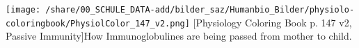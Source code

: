 		\begin{minipage}{8cm}
		  \texttt{[image: /share/00\_SCHULE\_DATA-add/bilder\_saz/Humanbio\_Bilder/physiolo-coloringbook/PhysiolColor\_147\_v2.png]}
		  [Physiology Coloring Book p. 147 v2, Passive Immunity]{How Immunoglobulines are being passed from mother to child.}
		  \label{fig:PassiveImmunity}
		\end{minipage}
\vfill
%
%
%
%
%
%
%
